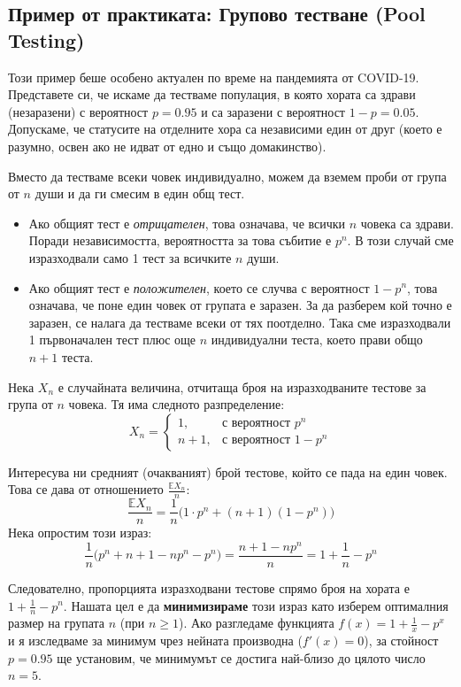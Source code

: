 \documentclass{article}
\begin{document}
\subsection{Пример от практиката: Групово тестване (Pool Testing)}

Този пример беше особено актуален по време на пандемията от COVID-19. Представете си, че искаме да тестваме популация, в която хората са здрави (незаразени) с вероятност $p = 0.95$ и са заразени с вероятност $1-p = 0.05$. Допускаме, че статусите на отделните хора са независими един от друг (което е разумно, освен ако не идват от едно и също домакинство).

Вместо да тестваме всеки човек индивидуално, можем да вземем проби от група от $n$ души и да ги смесим в един общ тест. 
\begin{itemize}
    \item Ако общият тест е \textit{отрицателен}, това означава, че всички $n$ човека са здрави. Поради независимостта, вероятността за това събитие е $p^n$. В този случай сме изразходвали само 1 тест за всичките $n$ души.
    \item Ако общият тест е \textit{положителен}, което се случва с вероятност $1 - p^n$, това означава, че поне един човек от групата е заразен. За да разберем кой точно е заразен, се налага да тестваме всеки от тях поотделно. Така сме изразходвали 1 първоначален тест плюс още $n$ индивидуални теста, което прави общо $n+1$ теста.
\end{itemize}

Нека $X_n$ е случайната величина, отчитаща броя на изразходваните тестове за група от $n$ човека. Тя има следното разпределение:
\[
X_n =
\begin{cases}
1, & \text{с вероятност } p^n \\
n+1, & \text{с вероятност } 1-p^n
\end{cases}
\]

Интересува ни средният (очакваният) брой тестове, който се пада на един човек. Това се дава от отношението $\frac{\mathbb{E}X_n}{n}$:
\[ \frac{\mathbb{E}X_n}{n} = \frac{1}{n} \Big( 1 \cdot p^n + (n+1)(1-p^n) \Big) \]
Нека опростим този израз:
\[ \frac{1}{n} \Big( p^n + n + 1 - np^n - p^n \Big) = \frac{n + 1 - np^n}{n} = 1 + \frac{1}{n} - p^n \]

Следователно, пропорцията изразходвани тестове спрямо броя на хората е $1 + \frac{1}{n} - p^n$. Нашата цел е да \textbf{минимизираме} този израз като изберем оптималния размер на групата $n$ (при $n \ge 1$). 
Ако разгледаме функцията $f(x) = 1 + \frac{1}{x} - p^x$ и я изследваме за минимум чрез нейната производна ($f'(x) = 0$), за стойност $p = 0.95$ ще установим, че минимумът се достига най-близо до цялото число $n = 5$.
\end{document}
